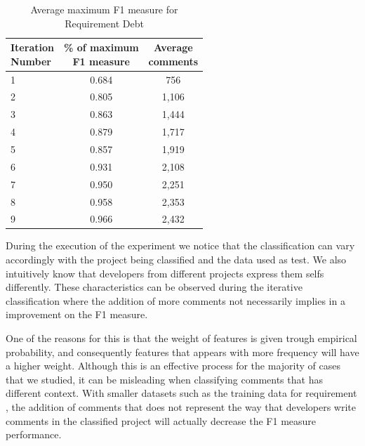 \begin{table}[!hbt]
	\begin{center}
		\caption{Average maximum F1 measure for Requirement Debt}
		\label{tbl:requirement_iteration_performance}
		\begin{tabular}{l| c c }
			\toprule
			\thead{Iteration\\Number} & \thead{\% of maximum\\F1 measure} & \thead{Average\\comments} \\
			\midrule
			1  &  0.684  & 756 \\  
			2  &  0.805  & 1,106 \\  
			3  &  0.863  & 1,444 \\  
			4  &  0.879  & 1,717 \\  
			5  &  0.857  & 1,919 \\  
			6  &  0.931  & 2,108 \\  
			7  &  0.950  & 2,251 \\  
			8  &  0.958  & 2,353 \\  
			9  &  0.966  & 2,432 \\  
			\bottomrule
		\end{tabular}
	\end{center}    
\end{table}


During the execution of the experiment we notice that the classification can vary accordingly with the project being classified and the data used as test. We also intuitively know that developers from different projects express them selfs differently. These characteristics can be observed during the iterative classification where the addition of more comments not necessarily implies in a improvement on the F1 measure.

One of the reasons for this is that the weight of features is given trough empirical probability, and consequently features that appears with more frequency will have a higher weight. Although this is an effective process for the majority of cases that we studied, it can be misleading when classifying comments that has different context. With smaller datasets such as the training data for requirement \SATD, the addition of comments that does not represent the way that developers write comments in the classified project will actually decrease the F1 measure performance. 

